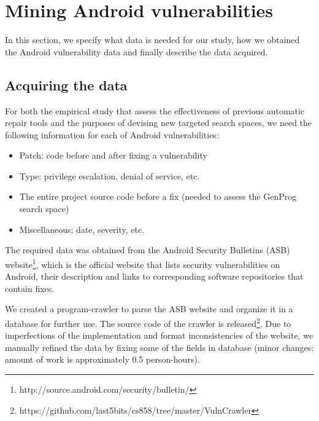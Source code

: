 \section{Mining Android vulnerabilities}

In this section, we specify what data is needed for our study, how we obtained the Android vulnerability data and finally describe the data acquired.

\subsection{Acquiring the data}

For both the empirical study that assess the effectiveness of previous automatic repair tools and the purposes of devising new targeted search spaces, we need the following information for each of Android vulnerabilities:
\begin{itemize}
    \item Patch: code before and after fixing a vulnerability
    \item Type: privilege escalation, denial of service, etc.
    \item The entire project source code before a fix (needed to assess the GenProg search space)
    \item Miscellaneous: date, severity, etc.
\end{itemize}


The required data was obtained from the Android Security Bulletins (ASB) website\footnote{http://source.android.com/security/bulletin/}, which is the official website that lists security vulnerabilities on Android, their description and links to corresponding software repositories that contain fixes.

We created a program-crawler to parse the ASB website and organize it in a database for further use. The source code of the crawler is released\footnote{https://github.com/last5bits/cs858/tree/master/VulnCrawler}. Due to imperfections of the implementation and format inconsistencies of the website, we manually refined the data by fixing some of the fields in database (minor changes: amount of work is approximately 0.5 person-hours).

